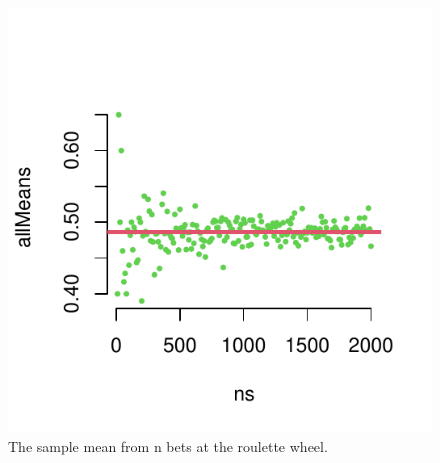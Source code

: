 \begin{knitrout}
\color{fgcolor}\begin{kframe}
\begin{alltt}
\hlstd{(}\hlstd{)}
 \hlkwb{<-} \hlstd{(}\hlstd{,} \hlstd{,} \hlstd{=}\hlstd{)}
 \hlkwb{<-} 
 \hlkwb{<-} \hlstd{(}
   \hlopt{:}
   \hlkwb{<-}  \hlstd{=}\hlstd{,} \hlstd{=}\hlopt{/}\hlstd{)}
   \hlkwb{<-} 
\hlstd{\}}
 \hlstd{=}\hlstd{,} \hlstd{=}\hlstd{,} \hlstd{=}\hlstd{,} \hlstd{=}\hlstd{)}
\hlstd{(}\hlstd{);} \hlstd{(}\hlstd{)}
\hlstd{(}\hlstd{=}\hlopt{/}\hlstd{,} \hlstd{=}\hlstd{,}\hlstd{=}\hlstd{)}
\end{alltt}
\end{kframe}\begin{figure}

{\centering \includegraphics[width=\maxwidth]{figure/intro-lln1-2-1} 

}

\caption[The sample mean from n bets at the roulette wheel]{The sample mean from n bets at the roulette wheel.}\label{fig:intro-lln1-2}
\end{figure}

\end{knitrout}

